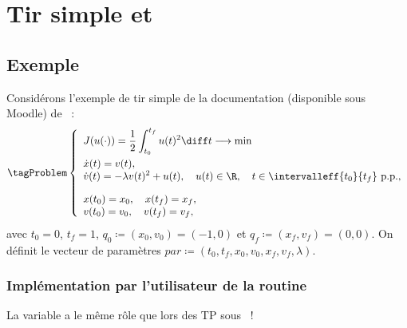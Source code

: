 \section{Tir simple et \hampath}

\subsection{Exemple}

Consid\'erons l'exemple de tir simple de la documentation (disponible sous Moodle) de \hampath~:
\vspace{-1em}
\leqnomode
\begin{equation}\label{eq:pbsimple}
    \tagProblem
    \left\{
    \begin{array}{l}
        \displaystyle J(u(\cdot)) = \frac{1}{2} \int_{t_0}^{t_f}u(t)^2 \diff t \longrightarrow \min                             \\[1.0em]
        \displaystyle \dot{x}(t) = v(t),                                                                                        \\
        \displaystyle \dot{v}(t) = -\lambda v(t)^2+u(t), \quad u(t) \in \R, \quad t \in \intervalleff{t_0}{t_f} \text{ p.p.},   \\[1.0em]
        \displaystyle x(t_0) = x_0,   \quad x(t_f) = x_f,                                                                       \\
        \displaystyle v(t_0) = v_0,   \quad v(t_f) = v_f,
    \end{array} 
    \right.
\end{equation}
\reqnomode
avec $t_0 = 0$, $t_f = 1$, $q_0 \coloneqq (x_0,v_0) = (-1,0)$ et $q_f \coloneqq (x_f,v_f) = (0,0)$. On d\'efinit le vecteur de param\`etres
$par \coloneqq (t_0, t_f, x_0, v_0, x_f, v_f, \lambda)$.

\subsubsection{Impl\'ementation par l'utilisateur de la routine \fortran\ }

\begin{myremark}
    La variable  a le m\^eme r\^ole que lors des TP sous \matlab\ !
\end{myremark}

